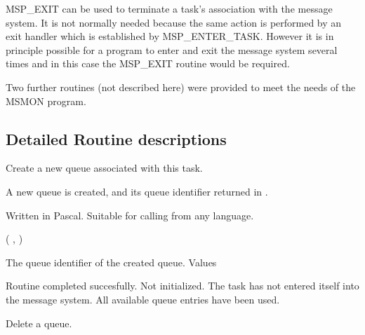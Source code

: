 MSP\_EXIT can be used to terminate a task's association with
the message system. It is not normally needed because the same action
is performed by an exit handler which is established by MSP\_ENTER\_TASK.
However it is in principle possible for a program to enter and exit the
message system several times and in this case the MSP\_EXIT routine would
be required.

Two further routines (not described here) were provided to meet the needs of
the MSMON program.

\newpage
\begin{appendix}

\section{Detailed Routine descriptions}

\begin{manroutinedescription}
      Create a new queue associated with this task.

      A new queue is created, and its queue identifier returned
      in {}.

      Written in Pascal. Suitable for calling from any language.

      {} {\mantt{=}} {} ( {}, {} )

\begin{manparametertable}
                          The queue identifier of the created queue.
      {} Values
\end{manparametertable}
\begin{mantwocolumntable}
  Routine completed succesfully.
  {} Not initialized.
  The task has not entered %
itself
                         into the message system.
  All available queue entries
                         have been used.
\end{mantwocolumntable}
\end{manroutinedescription}
\begin{manroutinedescription}
      Delete a queue.


\end{manroutinedescription}
\end{appendix}
